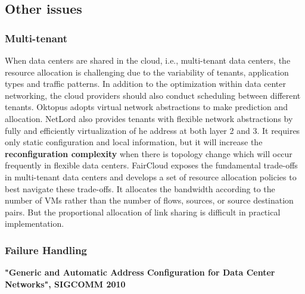 \documentclass[journal,onecolumn,11pt]{IEEEtran}
\begin{document}

\subsection{Other issues}

\subsubsection{Multi-tenant}

When data centers are shared in the cloud, i.e., multi-tenant data centers, the resource allocation is challenging due to the variability of tenants, application types and traffic patterns. In addition to the optimization within data center networking, the cloud providers should also conduct scheduling between different tenants. Oktopus \cite{Ballani:2011:TPD:2018436.2018465} adopts virtual network abstractions to make prediction and allocation. NetLord \cite{Mudigonda:2011:NSM:2018436.2018444} also provides tenants with flexible network abstractions by fully and efficiently virtualization of he address at both layer 2 and 3. It requires only static configuration and local information, but it will increase the \textbf{reconfiguration complexity} when there is topology change which will occur frequently in flexible data centers. FairCloud \cite{Popa:2011:FSN:2070562.2070584} exposes the fundamental trade-offs in multi-tenant data centers and develops a set of resource allocation policies to best navigate these trade-offs. It allocates the bandwidth according to the number of VMs rather than the number of flows, sources, or source destination pairs. But the proportional allocation of link sharing is difficult in practical implementation.

\subsubsection{Failure Handling}

\textbf{"Generic and Automatic Address Configuration for Data Center Networks", SIGCOMM 2010}
\end{document}
